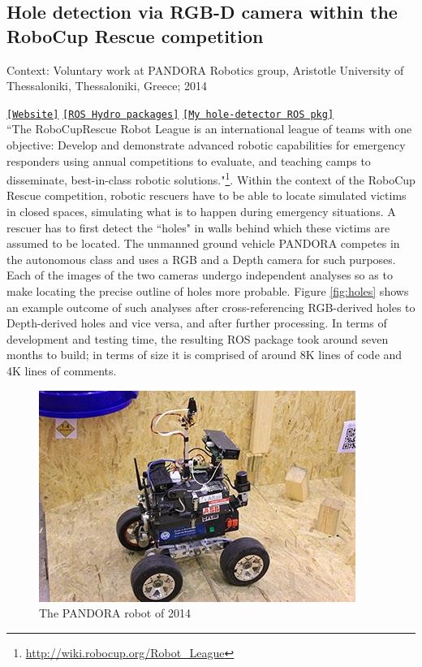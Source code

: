 \subsection{Hole detection via RGB-D camera within the RoboCup Rescue competition}

Context: Voluntary work at PANDORA Robotics group, Aristotle University of
Thessaloniki, Thessaloniki, Greece; 2014

\noindent \href{http://pandora.ee.auth.gr/}{\texttt{[Website]}} \href{https://github.com/pandora-auth-ros-pkg}{\texttt{[ROS Hydro packages]}} \href{https://github.com/li9i/pandora_vision_2014/tree/hydro-devel/pandora_vision_hole_detector}{\texttt{[My hole-detector ROS pkg]}}\\


``The RoboCupRescue Robot League is an international league of teams with one
objective: Develop and demonstrate advanced robotic capabilities for emergency
responders using annual competitions to evaluate, and teaching camps to
disseminate, best-in-class robotic
solutions."\footnote{\url{http://wiki.robocup.org/Robot_League}}. Within the
context of the RoboCup Rescue competition, robotic rescuers have to be able to
locate simulated victims in closed spaces, simulating what is to happen during
emergency situations. A rescuer has to first detect the ``holes" in walls
behind which these victims are assumed to be located. The unmanned ground
vehicle PANDORA competes in the autonomous class and uses a RGB and a Depth
camera for such purposes. Each of the images of the two cameras undergo
independent analyses so as to make locating the precise outline of holes more
probable. Figure \ref{fig:holes} shows an example outcome of such analyses
after cross-referencing RGB-derived holes to Depth-derived holes and vice
versa, and after further processing. In terms of development and testing time,
the resulting ROS package took around seven months to build; in terms of size
it is comprised of around 8K lines of code and 4K lines of comments.

\begin{figure}[H]\centering
  \includegraphics[scale=1.5]{images/pandora_robot.jpg}
  \caption{\small The PANDORA robot of 2014}
  \label{fig:pandora_robot}
\end{figure}

